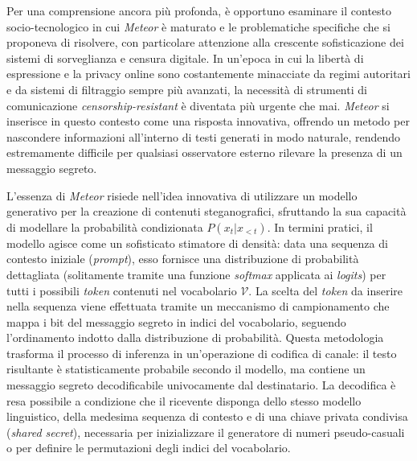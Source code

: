 Per una comprensione ancora più profonda, è opportuno esaminare il contesto socio-tecnologico in cui \emph{Meteor} è maturato e le problematiche specifiche che si proponeva di risolvere, con particolare attenzione alla crescente sofisticazione dei sistemi di sorveglianza e censura digitale. In un'epoca in cui la libertà di espressione e la privacy online sono costantemente minacciate da regimi autoritari e da sistemi di filtraggio sempre più avanzati, la necessità di strumenti di comunicazione \emph{censorship-resistant} è diventata più urgente che mai. \emph{Meteor} si inserisce in questo contesto come una risposta innovativa, offrendo un metodo per nascondere informazioni all'interno di testi generati in modo naturale, rendendo estremamente difficile per qualsiasi osservatore esterno rilevare la presenza di un messaggio segreto.

L'essenza di \emph{Meteor} risiede nell'idea innovativa di utilizzare un modello generativo per la creazione di contenuti steganografici, sfruttando la sua capacità di modellare la probabilità condizionata $P(x_t | x_{<t})$. In termini pratici, il modello agisce come un sofisticato stimatore di densità: data una sequenza di contesto iniziale (\emph{prompt}), esso fornisce una distribuzione di probabilità dettagliata (solitamente tramite una funzione \emph{softmax} applicata ai \emph{logits}) per tutti i possibili \emph{token} contenuti nel vocabolario $\mathcal{V}$. La scelta del \emph{token} da inserire nella sequenza viene effettuata tramite un meccanismo di campionamento che mappa i bit del messaggio segreto in indici del vocabolario, seguendo l'ordinamento indotto dalla distribuzione di probabilità. Questa metodologia trasforma il processo di inferenza in un'operazione di codifica di canale: il testo risultante è statisticamente probabile secondo il modello, ma contiene un messaggio segreto decodificabile univocamente dal destinatario. La decodifica è resa possibile a condizione che il ricevente disponga dello stesso modello linguistico, della medesima sequenza di contesto e di una chiave privata condivisa (\emph{shared secret}), necessaria per inizializzare il generatore di numeri pseudo-casuali o per definire le permutazioni degli indici del vocabolario.

